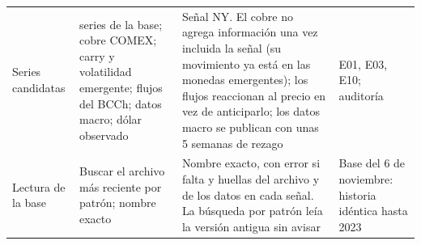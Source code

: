 \documentclass[11pt,a4paper]{article}
\begin{document}
\begin{table}[htbp]
\begin{tabularx}{\textwidth}{@{}>{\raggedright\arraybackslash}p{2.3cm} >{\raggedright\arraybackslash}X >{\raggedright\arraybackslash}X >{\raggedright\arraybackslash}p{2.4cm}@{}}
Series candidatas & 21 series de la base; cobre COMEX; carry y volatilidad emergente; flujos del BCCh; datos macro; dólar observado & Señal NY. El cobre no agrega información una vez incluida la señal (su movimiento ya está en las monedas emergentes); los flujos reaccionan al precio en vez de anticiparlo; los datos macro se publican con unas 5 semanas de rezago & E01, E03, E10; auditoría \\
Lectura de la base & Buscar el archivo más reciente por patrón; nombre exacto & Nombre exacto, con error si falta y huellas del archivo y de los datos en cada señal. La búsqueda por patrón leía la versión antigua sin avisar & Base del 6 de noviembre: historia idéntica hasta 2023 \\
\bottomrule
\end{tabularx}
\end{table}
\end{document}
